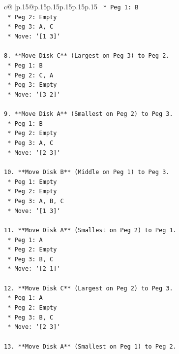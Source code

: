 \documentclass{article}
\begin{document}
{\begin{supertabular}{c@{$\;$}|p{.15\linewidth}@{}p{.15\linewidth}p{.15\linewidth}p{.15\linewidth}p{.15\linewidth}p{.15\linewidth}}
{{{\texttt{    *   Peg 1: B} \\
\texttt{    *   Peg 2: Empty} \\
\texttt{    *   Peg 3: A, C} \\
\texttt{    *   Move: `{[}1 3{]}`} \\
\\ 
\texttt{8.  **Move Disk C** (Largest on Peg 3) to Peg 2.} \\
\texttt{    *   Peg 1: B} \\
\texttt{    *   Peg 2: C, A} \\
\texttt{    *   Peg 3: Empty} \\
\texttt{    *   Move: `{[}3 2{]}`} \\
\\ 
\texttt{9.  **Move Disk A** (Smallest on Peg 2) to Peg 3.} \\
\texttt{    *   Peg 1: B} \\
\texttt{    *   Peg 2: Empty} \\
\texttt{    *   Peg 3: A, C} \\
\texttt{    *   Move: `{[}2 3{]}`} \\
\\ 
\texttt{10. **Move Disk B** (Middle on Peg 1) to Peg 3.} \\
\texttt{    *   Peg 1: Empty} \\
\texttt{    *   Peg 2: Empty} \\
\texttt{    *   Peg 3: A, B, C} \\
\texttt{    *   Move: `{[}1 3{]}`} \\
\\ 
\texttt{11. **Move Disk A** (Smallest on Peg 2) to Peg 1.} \\
\texttt{    *   Peg 1: A} \\
\texttt{    *   Peg 2: Empty} \\
\texttt{    *   Peg 3: B, C} \\
\texttt{    *   Move: `{[}2 1{]}`} \\
\\ 
\texttt{12. **Move Disk C** (Largest on Peg 2) to Peg 3.} \\
\texttt{    *   Peg 1: A} \\
\texttt{    *   Peg 2: Empty} \\
\texttt{    *   Peg 3: B, C} \\
\texttt{    *   Move: `{[}2 3{]}`} \\
\\ 
\texttt{13. **Move Disk A** (Smallest on Peg 1) to Peg 2.} \\
}}}
\end{supertabular}}
\end{document}
